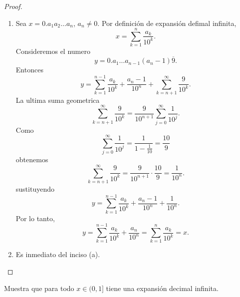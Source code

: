 \documentclass[12pt,a4paper]{article}
\begin{document}
    \begin{proof}
        \begin{enumerate}
            \item[(a)] Sea $x=0.a_{1}a_{2}\dots a_{n}$, $a_{n}\neq0$. Por definición de expansión defimal infinita,
            \begin{equation*}
                x=\sum_{k=1}^{n}\frac{a_{k}}{10^{k}}.
            \end{equation*}
            Consideremos el numero
            \begin{equation*}
                y=0.a_{1}\dots a_{n-1}(a_{n}-1)\overline{9}.
            \end{equation*}
            Entonces
            \begin{equation*}
                y=\sum_{k=1}^{n-1}\frac{a_{k}}{10^{k}}+\frac{a_{n}-1}{10^{n}}+\sum_{k=n+1}^{\infty}\frac{9}{10^{k}}.
            \end{equation*}
            La ultima suma geometrica
            \begin{equation*}
                \sum_{k=n+1}^{\infty}\frac{9}{10^{k}}=\frac{9}{10^{n+1}}\sum_{j=0}^{\infty}\frac{1}{10^{j}}.
            \end{equation*}
            Como
            \begin{equation*}
                \sum_{j=0}^{\infty}\frac{1}{10^{j}}=\frac{1}{1-\frac{1}{10}}=\frac{10}{9}
            \end{equation*}
            obtenemos
            \begin{equation*}
                \sum_{k=n+1}^{\infty}\frac{9}{10^{k}}=\frac{9}{10^{n+1}}\cdot\frac{10}{9}=\frac{1}{10^{n}}.
            \end{equation*}
            sustituyendo
            \begin{equation*}
                y=\sum_{k=1}^{n-1}\frac{a_{k}}{10^{k}}+\frac{a_{n}-1}{10^{n}}+\frac{1}{10^{n}}.
            \end{equation*}
            Por lo tanto,
            \begin{equation*}
                y=\sum_{k=1}^{n-1}\frac{a_{k}}{10^{k}}+\frac{a_{n}}{10^{n}}=\sum_{k=1}^{n}\frac{a_{k}}{10^{k}}=x.
            \end{equation*}
            \item[(b)] Es inmediato del inciso (a).
        \end{enumerate}
    \end{proof}
    
    \begin{mdframed}[style=mdpinkbox,frametitle={Ejercicio 6}]
        Muestra que para todo $x\in(0,1]$ tiene una expansión decimal infinita.
    \end{mdframed}
    
\end{document}
